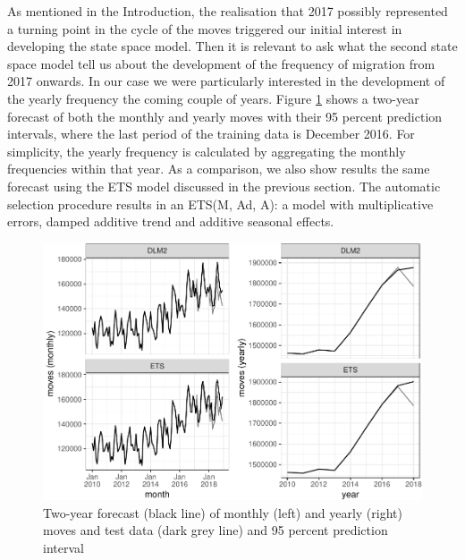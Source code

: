 \documentclass[]{article}
\begin{document}
As mentioned in the Introduction, the realisation that 2017 possibly
represented a turning point in the cycle of the moves triggered our
initial interest in developing the state space model. Then it is
relevant to ask what the second state space model tell us about the
development of the frequency of migration from 2017 onwards. In our case
we were particularly interested in the development of the yearly
frequency the coming couple of years. Figure \ref{fig:forecast-2017}
shows a two-year forecast of both the monthly and yearly moves with
their 95 percent prediction intervals, where the last period of the
training data is December 2016. For simplicity, the yearly frequency is
calculated by aggregating the monthly frequencies within that year. As a
comparison, we also show results the same forecast using the ETS model
discussed in the previous section. The automatic selection procedure
results in an ETS(M, Ad, A): a model with multiplicative errors, damped
additive trend and additive seasonal effects.

\begin{figure}
\centering
\includegraphics{../figs/freq--forecast-2017-1.pdf}
\caption{\label{fig:forecast-2017}Two-year forecast (black line) of monthly
(left) and yearly (right) moves and test data (dark grey line) and 95
percent prediction interval}
\end{figure}
\end{document}
